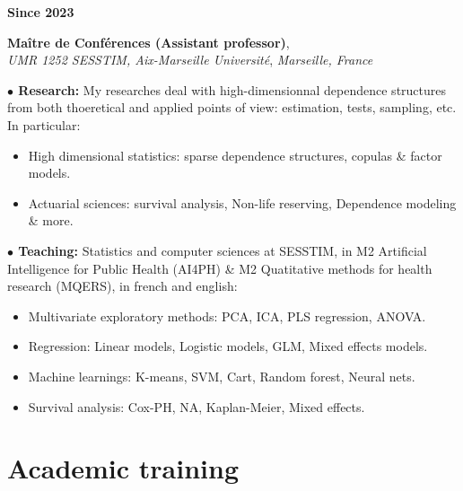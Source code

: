 \documentclass[a4paper,11pt]{article}
\newcommand{\tabcv}[2]{
\begin{minipage}[t]{0.12\linewidth}
\textbf{\footnotesize #1}
\end{minipage}\hfill
\begin{minipage}[t]{0.85\linewidth}
#2
\end{minipage}
\vspace{1em}
}
\begin{document}
\begin{flushleft}
\tabcv{Since 2023}{
\textbf{Maître de Conférences (Assistant professor)},\\ \textit{UMR 1252 SESSTIM, Aix-Marseille Université}, \textit{Marseille, France}\\[0.5em]
{\footnotesize
\textbf{$\bullet$ Research:} My researches deal with high-dimensionnal dependence structures from both thoeretical and applied points of view: estimation, tests, sampling, etc. In particular: 
\begin{itemize}
  \item High dimensional statistics: sparse dependence structures, copulas \& factor models.
  \item Actuarial sciences: survival analysis, Non-life reserving, Dependence modeling \& more.
\end{itemize}
\textbf{$\bullet$ Teaching:} Statistics and computer sciences at SESSTIM, in M2 Artificial Intelligence for Public Health (AI4PH)  \& M2 Quatitative methods for health research (MQERS), in french and english:
\begin{itemize}
  \item Multivariate exploratory methods: PCA, ICA, PLS regression, ANOVA.
  \item Regression: Linear models, Logistic models, GLM, Mixed effects models.
  \item Machine learnings: K-means, SVM, Cart, Random forest, Neural nets. 
  \item Survival analysis: Cox-PH, NA, Kaplan-Meier, Mixed effects.
\end{itemize}
}
}

\section{Academic training}\label{subsec:formation_academique}


\end{flushleft}
\end{document}
